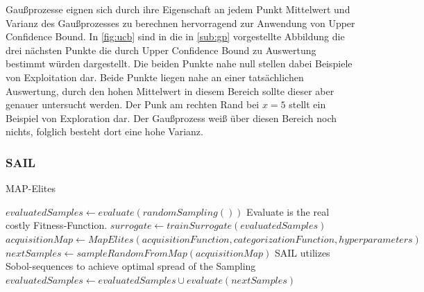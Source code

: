 Gaußprozesse eignen sich durch ihre Eigenschaft an jedem Punkt Mittelwert und Varianz des Gaußprozesses zu berechnen hervorragend zur Anwendung von Upper Confidence Bound.
In \cref{fig:ucb} sind in die in \cref{sub:gp} vorgestellte Abbildung die drei nächsten Punkte die durch Upper Confidence Bound zu Auswertung bestimmt würden dargestellt.
Die beiden Punkte nahe null stellen dabei Beispiele von Exploitation dar. 
Beide Punkte liegen nahe an einer tatsächlichen Auswertung, durch den hohen Mittelwert in diesem Bereich sollte dieser aber genauer untersucht werden.
Der Punk am rechten Rand bei $x=5$ stellt ein Beispiel von Exploration dar.
Der Gaußprozess weiß über diesen Bereich noch nichts, folglich besteht dort eine hohe Varianz.


\subsubsection{SAIL}

\begin{algorithm}
	\caption{MAP-Elites} \label{alg:mapElites}
	\begin{algorithmic}[1]
\State $evaluatedSamples \gets evaluate(randomSampling())$ \Comment Evaluate is the real costly Fitness-Function.
\Else
\State $surrogate \gets trainSurrogate(evaluatedSamples)$
\State $acquisitionMap \gets MapElites(acquisitionFunction,categorizationFunction,hyperparameters)$
\State $nextSamples \gets sampleRandomFromMap(acquisitionMap)$ \Comment SAIL utilizes Sobol-sequences to achieve optimal spread of the Sampling
\State $evaluatedSamples \gets evaluatedSamples \cup evaluate(nextSamples)$
\EndIf
			\EndWhile
		\EndProcedure
	\end{algorithmic}
\end{algorithm}

